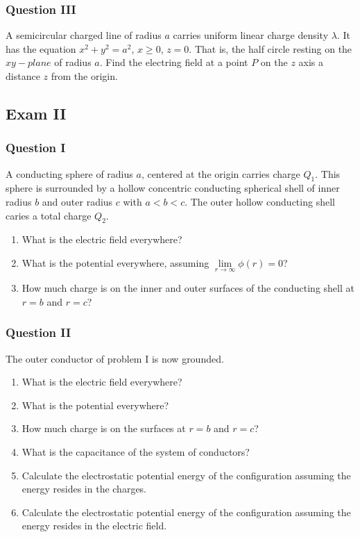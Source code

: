 \documentclass[oneside]{book}
\theoremstyle{definition}
\begin{document}
\subsubsection{Question III}

A semicircular charged line of radius $a$ carries uniform linear charge density $\lambda$. It has the equation $x^2+y^2 = a^2$, $x\geq 0$, $z=0$. That is, the half circle resting on the $xy-plane$ of radius $a$. Find the electring field at a point $P$ on the $z$ axis a distance $z$ from the origin.

\subsection*{Exam II}


\subsubsection{Question I}
A conducting sphere of radius $a$, centered at the origin carries charge $Q_1$. This sphere is surrounded by a hollow concentric conducting spherical shell of inner radius $b$ and outer radius $c$ with $a<b<c$. The outer hollow conducting shell caries a total charge $Q_2$. 
\begin{enumerate}
\item What is the electric field everywhere?
\item What is the potential everywhere, assuming $\underset{r\rightarrow \infty} \lim \phi(r) = 0$?
\item How much charge is on the inner and outer surfaces of the conducting shell at $r=b$ and $r=c$?
\end{enumerate}

\subsubsection{Question II}
The outer conductor of problem I is now grounded.
\begin{enumerate}
\item What is the electric field everywhere?
\item What is the potential everywhere?
\item How much charge is on the surfaces at $r=b$ and $r=c$?
\item What is the capacitance of the system of conductors?
\item Calculate the electrostatic potential energy of the configuration assuming the energy resides in the charges.
\item Calculate the electrostatic potential energy of the configuration assuming the energy resides in the electric field.
\end{enumerate}
\end{document}
